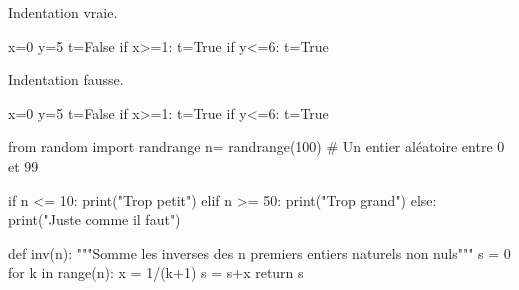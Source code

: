 \question{} 
Indentation vraie.
\begin{pyverbatim}
x=0
y=5
t=False
if x>=1:
    t=True
if y<=6:
    t=True
\end{pyverbatim}
Indentation fausse.
\begin{pyverbatim}
x=0
y=5
t=False
if x>=1:
    t=True
    if y<=6:
        t=True
\end{pyverbatim}



\medskip{}


\question{} 
\begin{pyverbatim}
from random import randrange
n= randrange(100) # Un entier aléatoire entre 0 et 99

if n <= 10:
    print("Trop petit")
elif n >= 50:
    print("Trop grand")
else:
    print("Juste comme il faut")
\end{pyverbatim}


\medskip{}

\question{} 
\begin{pyverbatim}
def inv(n):
    """Somme les inverses des n premiers entiers naturels non nuls"""
    s = 0
    for k in range(n):
        x = 1/(k+1)
        s = s+x
    return s
\end{pyverbatim}